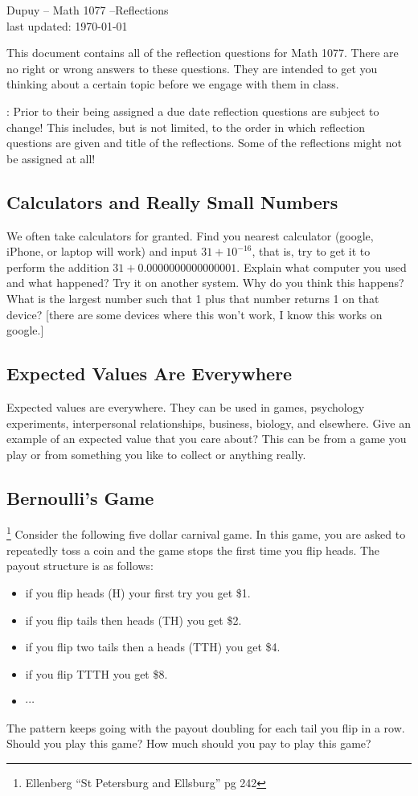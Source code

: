 \documentclass[]{article}
\numberwithin{equation}{section}
\theoremstyle{definition}
\theoremstyle{remark}
\begin{document}
	
\begin{center}
	{\Large \sc Dupuy -- Math 1077  --Reflections }\\
	last updated: \today
\end{center}

\noindent This document contains all of the reflection questions for Math 1077. 
There are no right or wrong answers to these questions. They are intended to get you thinking about a certain topic before we engage with them in class.
\vspace{1em}

: Prior to their being assigned a due date reflection questions are subject to change! This includes, but is not limited, to the order in which reflection questions are given and title of the reflections. Some of the reflections might not be assigned at all!

\subsection{Calculators and Really Small Numbers }
We often take calculators for granted. 
Find you nearest calculator (google, iPhone, or laptop will work) and input $31+10^{-16}$, that is, try to get it to perform the addition $31 + 0.0000000000000001$.
Explain what computer you used and what happened? 
Try it on another system. 
Why do you think this happens?
What is the largest number such that 1 plus that number returns 1 on that device? [there are some devices where this won't work, I know this works on google.]

\subsection{Expected Values Are Everywhere }
Expected values are everywhere.
They can be used in games, psychology experiments, interpersonal relationships, business, biology, and elsewhere. 
Give an example of an expected value that you care about? This can be from a game you play or from something you like to collect or anything really. 

\subsection{Bernoulli's Game}\footnote{Ellenberg ``St Petersburg and Ellsburg'' pg 242}
Consider the following five dollar carnival game. 
In this game, you are asked to repeatedly toss a coin and the game stops the first time you flip heads. 
The payout structure is as follows:
\begin{itemize}
	\item if you flip heads (H) your first try you get \$1. 
	\item if you flip tails then heads (TH) you get \$2.
	\item if you flip two tails then a heads (TTH) you get \$4. 
	\item if you flip TTTH you get \$8.
	\item $\cdots$
\end{itemize}	
The pattern keeps going with the payout doubling for each tail you flip in a row. 
Should you play this game?
How much should you pay to play this game?
\end{document}
